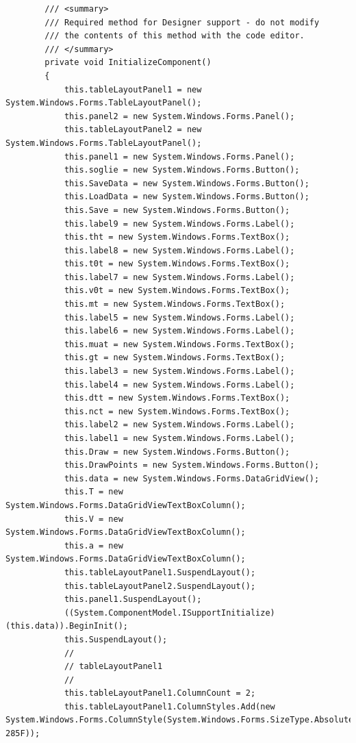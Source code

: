 \documentclass[11pt]{article} %
\begin{document}
\begin{lstlisting}
        /// <summary>
        /// Required method for Designer support - do not modify
        /// the contents of this method with the code editor.
        /// </summary>
        private void InitializeComponent()
        {
            this.tableLayoutPanel1 = new System.Windows.Forms.TableLayoutPanel();
            this.panel2 = new System.Windows.Forms.Panel();
            this.tableLayoutPanel2 = new System.Windows.Forms.TableLayoutPanel();
            this.panel1 = new System.Windows.Forms.Panel();
            this.soglie = new System.Windows.Forms.Button();
            this.SaveData = new System.Windows.Forms.Button();
            this.LoadData = new System.Windows.Forms.Button();
            this.Save = new System.Windows.Forms.Button();
            this.label9 = new System.Windows.Forms.Label();
            this.tht = new System.Windows.Forms.TextBox();
            this.label8 = new System.Windows.Forms.Label();
            this.t0t = new System.Windows.Forms.TextBox();
            this.label7 = new System.Windows.Forms.Label();
            this.v0t = new System.Windows.Forms.TextBox();
            this.mt = new System.Windows.Forms.TextBox();
            this.label5 = new System.Windows.Forms.Label();
            this.label6 = new System.Windows.Forms.Label();
            this.muat = new System.Windows.Forms.TextBox();
            this.gt = new System.Windows.Forms.TextBox();
            this.label3 = new System.Windows.Forms.Label();
            this.label4 = new System.Windows.Forms.Label();
            this.dtt = new System.Windows.Forms.TextBox();
            this.nct = new System.Windows.Forms.TextBox();
            this.label2 = new System.Windows.Forms.Label();
            this.label1 = new System.Windows.Forms.Label();
            this.Draw = new System.Windows.Forms.Button();
            this.DrawPoints = new System.Windows.Forms.Button();
            this.data = new System.Windows.Forms.DataGridView();
            this.T = new System.Windows.Forms.DataGridViewTextBoxColumn();
            this.V = new System.Windows.Forms.DataGridViewTextBoxColumn();
            this.a = new System.Windows.Forms.DataGridViewTextBoxColumn();
            this.tableLayoutPanel1.SuspendLayout();
            this.tableLayoutPanel2.SuspendLayout();
            this.panel1.SuspendLayout();
            ((System.ComponentModel.ISupportInitialize)(this.data)).BeginInit();
            this.SuspendLayout();
            // 
            // tableLayoutPanel1
            // 
            this.tableLayoutPanel1.ColumnCount = 2;
            this.tableLayoutPanel1.ColumnStyles.Add(new System.Windows.Forms.ColumnStyle(System.Windows.Forms.SizeType.Absolute, 285F));

\end{lstlisting}
\end{document}
